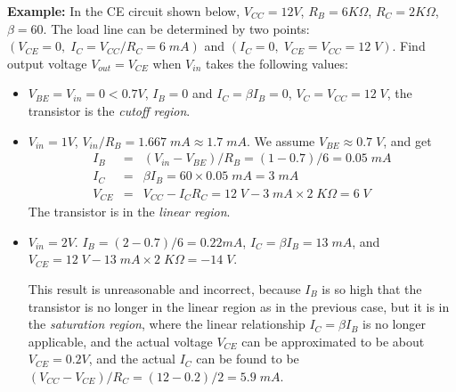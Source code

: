 {\bf Example:} In the CE circuit shown below, $V_{CC}=12V$, $R_B=6 K\Omega$,
$R_C=2 K\Omega$, $\beta=60$. The load line can be determined by two points:
$(V_{CE}=0,\;I_C=V_{CC}/R_C=6\;mA)$ and $(I_C=0,\;V_{CE}=V_{CC}=12\;V)$. Find output
voltage $V_{out}=V_{CE}$ when $V_{in}$ takes the following values:


\begin{itemize}
\item $V_{BE}=V_{in}=0<0.7V$, $I_B=0$ and $I_C=\beta I_B=0$, $V_C=V_{CC}=12\;V$,
  the transistor is the {\em cutoff region}.

\item $V_{in}=1V$, $V_{in}/R_B=1.667\;mA\approx 1.7\;mA$. We assume
  $V_{BE}\approx 0.7\;V$, and get 
  \begin{eqnarray}
    I_B&=&(V_{in}-V_{BE})/R_B=(1-0.7)/6=0.05\;mA \nonumber\\
    I_C&=&\beta I_B=60\times 0.05\;mA=3\; mA \nonumber\\
    V_{CE}&=&V_{CC}-I_C R_C=12\;V-3\;mA \times 2\;K\Omega=6\;V
    \nonumber
  \end{eqnarray}
  The transistor is in the {\em linear region}.
 
\item $V_{in}=2V$. $I_B=(2-0.7)/6=0.22mA$, $I_C=\beta I_B=13\;mA$, and 
  $V_{CE}=12\;V-13\;mA\times 2\;K\Omega=-14\;V$.

  This result is unreasonable and incorrect, because $I_B$ is so high 
  that the transistor is no longer in the linear region as in the previous
  case, but it is in the {\em saturation region}, where the linear relationship 
  $I_C=\beta I_B$ is no longer applicable, and the actual voltage $V_{CE}$ can
  be approximated to be about $V_{CE}=0.2V$, and the actual $I_C$ can be found 
  to be $(V_{CC}-V_{CE})/R_C=(12-0.2)/2=5.9\;mA$.
\end{itemize}

